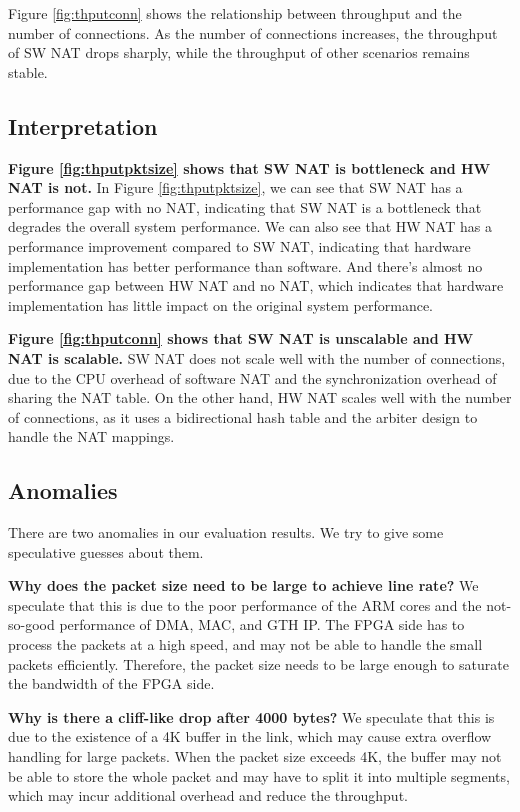 Figure \ref{fig:thputconn} shows the relationship between throughput and the number of connections. As the number of connections increases, the throughput of SW NAT drops sharply, while the throughput of other scenarios remains stable. 

\subsection{Interpretation}

\textbf{Figure \ref{fig:thputpktsize} shows that SW NAT is bottleneck and HW NAT is not.}
In Figure \ref{fig:thputpktsize}, we can see that SW NAT has a performance gap with no NAT, indicating that SW NAT is a bottleneck that degrades the overall system performance. We can also see that HW NAT has a performance improvement compared to SW NAT, indicating that hardware implementation has better performance than software. And there's almost no performance gap between HW NAT and no NAT, which indicates that hardware implementation has little impact on the original system performance.

\textbf{Figure \ref{fig:thputconn} shows that SW NAT is unscalable and HW NAT is scalable.}
SW NAT does not scale well with the number of connections, due to the CPU overhead of software NAT and the synchronization overhead of sharing the NAT table. On the other hand, HW NAT scales well with the number of connections, as it uses a bidirectional hash table and the arbiter design to handle the NAT mappings.

\subsection{Anomalies}
There are two anomalies in our evaluation results. We try to give some speculative guesses about them.

\textbf{Why does the packet size need to be large to achieve line rate?} We speculate that this is due to the poor performance of the ARM cores and the not-so-good performance of DMA, MAC, and GTH IP. The FPGA side has to process the packets at a high speed, and may not be able to handle the small packets efficiently. Therefore, the packet size needs to be large enough to saturate the bandwidth of the FPGA side.

\textbf{Why is there a cliff-like drop after 4000 bytes?} We speculate that this is due to the existence of a 4K buffer in the link, which may cause extra overflow handling for large packets. When the packet size exceeds 4K, the buffer may not be able to store the whole packet and may have to split it into multiple segments, which may incur additional overhead and reduce the throughput.



